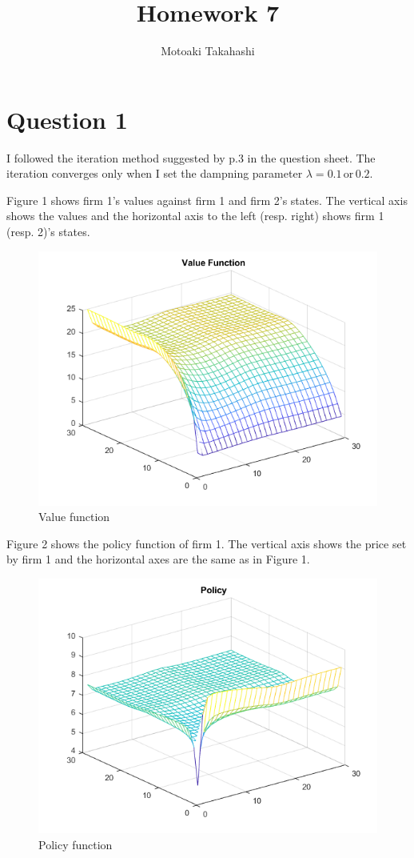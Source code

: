 \documentclass[12pt]{article}
\title{Homework 7}
\author{Motoaki Takahashi}
\date{}
\begin{document}
\maketitle
\section*{Question 1}
I followed the iteration method suggested by p.3 in the question sheet. The iteration converges only when I set the dampning parameter $\lambda = 0.1\, \text{or}\, 0.2$.\par
Figure 1 shows firm 1's values against firm 1 and firm 2's states. The vertical axis shows the values and the horizontal axis to the left (resp. right) shows firm 1 (resp. 2)'s states. 
\begin{figure}[h]
\includegraphics[width=\textwidth]{1.png}
\caption{Value function}
\end{figure}
\clearpage
Figure 2 shows the policy function of firm 1. The vertical axis shows the price set by firm 1 and the horizontal axes are the same as in Figure 1.
\begin{figure}[h]
\includegraphics[width=\textwidth]{2.png}
\caption{Policy function}
\end{figure}
\clearpage
\end{document}
